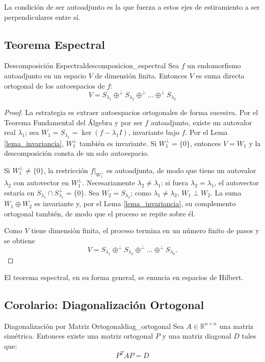 \documentclass[11pt, a4paper]{article}
\begin{document}
    La condición de ser autoadjunto es la que fuerza a estos ejes de estiramiento a ser perpendiculares entre sí.

\subsection{Teorema Espectral}

\begin{teorema}{Descomposición Espectral}{descomposicion_espectral}
Sea $f$ un endomorfismo autoadjunto en un espacio $V$ de dimensión finita.
Entonces $V$ es suma directa ortogonal de los autoespacios de $f$:
\[ V = S_{\lambda_1} \oplus^\perp S_{\lambda_2} \oplus^\perp \dots \oplus^\perp S_{\lambda_k} \]
\end{teorema}

\begin{proof}
La estrategia es extraer autoespacios ortogonales de forma sucesiva. Por el Teorema Fundamental del Álgebra y por ser $f$ autoadjunto, existe un autovalor real $\lambda_1$; sea $W_1 = S_{\lambda_1} = \ker(f - \lambda_1 I)$, invariante bajo $f$. Por el Lema \ref{lema_invariancia}, $W_1^\perp$ también es invariante. Si $W_1^\perp = \{0\}$, entonces $V = W_1$ y la descomposición consta de un solo autoespacio.

Si $W_1^\perp \neq \{0\}$, la restricción $f|_{W_1^\perp}$ es autoadjunta, de modo que tiene un autovalor $\lambda_2$ con autovector en $W_1^\perp$. Necesariamente $\lambda_2 \neq \lambda_1$: si fuera $\lambda_2 = \lambda_1$, el autovector estaría en $S_{\lambda_1} \cap S_{\lambda_1}^\perp = \{0\}$. Sea $W_2 = S_{\lambda_2}$; como $\lambda_1 \neq \lambda_2$, $W_1 \perp W_2$. La suma $W_1 \oplus W_2$ es invariante y, por el Lema \ref{lema_invariancia}, su complemento ortogonal también, de modo que el proceso se repite sobre él.

Como $V$ tiene dimensión finita, el proceso termina en un número finito de pasos y se obtiene
\[ V = S_{\lambda_1} \oplus^\perp S_{\lambda_2} \oplus^\perp \dots \oplus^\perp S_{\lambda_k}. \]
\end{proof}

\obs El teorema espectral, en su forma general, se enuncia en espacios de Hilbert.

\subsection{Corolario: Diagonalización Ortogonal}

\begin{corolario}{Diagonalización por Matriz Ortogonal}{diag_ortogonal}
Sea $A \in \mathbb{R}^{n \times n}$ una matriz simétrica.
Entonces existe una matriz ortogonal $P$ y una matriz diagonal $D$ tales que:
\[ P^T A P = D \]
\end{corolario}
\end{document}
